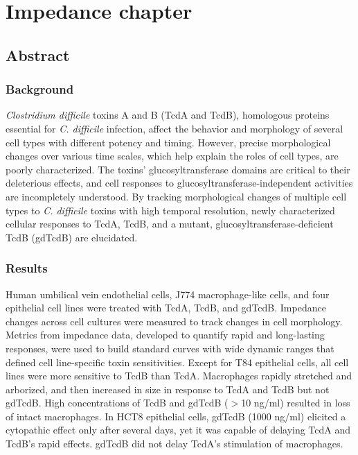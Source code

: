 \doublespacing

\chapter{ Impedance chapter }

\section{Abstract}

\subsection{Background}
\textit{Clostridium difficile} toxins A and B (TcdA and TcdB), homologous 
proteins essential for \textit{C. difficile} infection, affect the behavior 
and morphology of several cell types with different potency and 
timing. However, precise morphological changes over various time scales, 
which help explain the roles of cell types, are poorly characterized. 
The toxins' glucosyltransferase domains are critical to their 
deleterious effects, and cell responses to glucosyltransferase-independent 
activities are incompletely understood. By tracking morphological 
changes of multiple cell types to \textit{C. difficile} toxins with high 
temporal resolution, newly characterized cellular responses to 
TcdA, TcdB, and a mutant, glucosyltransferase-deficient TcdB 
(gdTcdB) are elucidated.

\subsection{Results}
Human umbilical vein endothelial cells, J774 macrophage-like 
cells, and four epithelial cell lines were treated with TcdA, 
TcdB, and gdTcdB. Impedance changes across cell cultures were 
measured to track changes in cell morphology. Metrics from 
impedance data, developed to quantify rapid and long-lasting 
responses, were used to build standard curves with wide dynamic 
ranges that defined cell line-specific toxin sensitivities. Except 
for T84 epithelial cells, all cell lines were more sensitive to TcdB 
than TcdA. Macrophages rapidly stretched and arborized, and then 
increased in size in response to TcdA and TcdB but not gdTcdB. 
High concentrations of TcdB and gdTcdB ($>$10 ng/ml) resulted 
in loss of intact macrophages. In HCT8 epithelial cells, 
gdTcdB (1000 ng/ml) elicited a cytopathic effect only after 
several days, yet it was capable of delaying TcdA and TcdB's 
rapid effects. gdTcdB did not delay TcdA's stimulation of macrophages.

